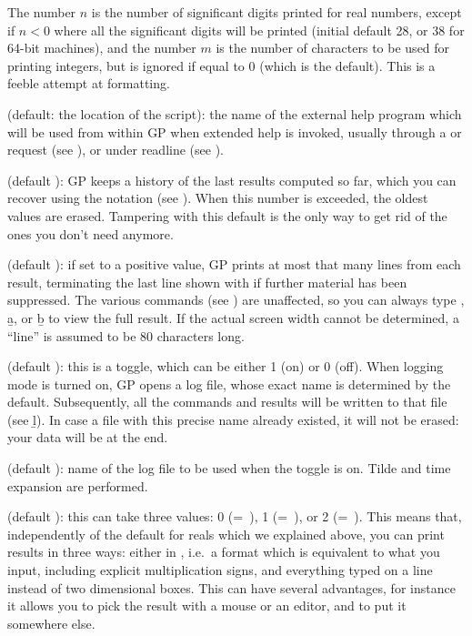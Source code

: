 The number $n$ is the number of significant digits printed for real
numbers, except if $n<0$ where all the significant digits will be printed
(initial default 28, or 38 for 64-bit machines), and the number $m$ is the
number of characters to be used for printing integers, but is ignored if
equal to 0 (which is the default). This is a feeble attempt at formatting.

 (default: the location of the  script): the
name of the external help program which will be used from within GP when
extended help is invoked, usually through a  or  request
(see ), or  under readline (see
).

 (default ): GP keeps a history of the last
 results computed so far, which you can recover using the
\kbd{\%} notation (see ). When this number is exceeded,
the oldest values are erased. Tampering with this default is the only way to
get rid of the ones you don't need anymore.

 (default ): if set to a positive value, GP prints at
most that many lines from each result, terminating the last line shown with
\kbd{[+++]} if further material has been suppressed. The various 
commands (see ) are unaffected, so you can always type
, \b{a}, or \b{b} to view the full result. If the actual
screen width cannot be determined, a ``line'' is assumed to be 80 characters
long.

 (default ): this is a toggle, which can be either 1
(on) or 0 (off). When logging mode is turned on, GP opens a log file, whose
exact name is determined by the  default. Subsequently, all the
commands and results will be written to that file (see \b{l}). In case a file
with this precise name already existed, it will not be erased: your data will
be  at the end.

 (default ): name of the log file to be
used when the  toggle is on. Tilde and time expansion are performed.

 (default ): this can take three values: 0
(=~), 1 (=~), or 2 (=~). This
means that, independently of the default  for reals which we
explained above, you can print results in three ways: either in
, i.e.~a format which is equivalent to what you input,
including explicit multiplication signs, and everything typed on a line
instead of two dimensional boxes. This can have several advantages, for
instance it allows you to pick the result with a mouse or an editor, and to
put it somewhere else.\label{se:output}

